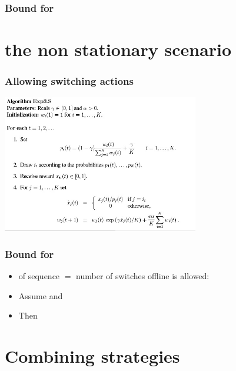 \documentclass[handout]{beamer}
\begin{document}
\begin{frame}
\frametitle{Bound for }
\end{frame}
\section{the non stationary scenario}

\begin{frame}
\frametitle{Allowing switching actions}
\includegraphics[height=6cm]{figures/Exp3-S.jpg}
\end{frame}

\begin{frame}
\frametitle{Bound for }
\begin{itemize}
\item {} of sequence $=$ number of switches offline is allowed:
\item  Assume  and
\item Then

\end{itemize}
\end{frame}

\section{Combining strategies}
\end{document}
